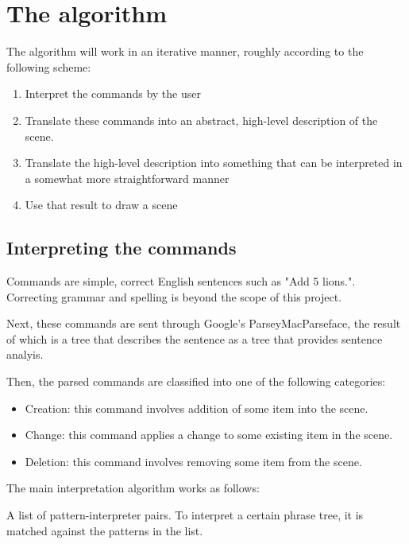 \documentclass[11pt]{article}
\begin{document}
\section{The algorithm}

The algorithm will work in an iterative manner, roughly according to the following scheme:

\begin{enumerate}

\item Interpret the commands by the user

\item Translate these commands into an abstract, high-level description of the scene.

\item Translate the high-level description into something that can be interpreted in a somewhat more straightforward manner

\item Use that result to draw a scene

\end{enumerate}

\subsection{Interpreting the commands}

Commands are simple, correct English sentences such as "Add 5 lions.". Correcting grammar and spelling is beyond the scope of this project.

Next, these commands are sent through Google's ParseyMacParseface, the result of which is a tree that describes the sentence as a tree that provides sentence analyis.

Then, the parsed commands are classified into one of the following categories:

\begin{itemize}
	\item Creation: this command involves addition of some item into the scene.
	\item Change: this command applies a change to some existing item in the scene.
	\item Deletion: this command involves removing some item from the scene.
\end{itemize}

The main interpretation algorithm works as follows:

A list of pattern-interpreter pairs. To interpret a certain phrase tree,
it is matched against the patterns in the list.
\end{document}
